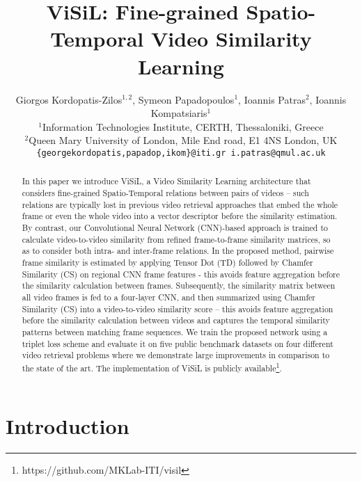 \documentclass[10pt,twocolumn,letterpaper]{article}
\begin{document}
\title{ViSiL: Fine-grained Spatio-Temporal Video Similarity Learning} 

\author{Giorgos Kordopatis-Zilos$^{1,2}$, Symeon Papadopoulos$^1$, Ioannis Patras$^2$, Ioannis Kompatsiaris$^1$\\
$^1$Information Technologies Institute, CERTH, Thessaloniki, Greece \\
$^2$Queen Mary University of London, Mile End road, E1 4NS London, UK \\
{\tt\small \{georgekordopatis,papadop,ikom\}@iti.gr \hspace*{1em} i.patras@qmul.ac.uk}}

\maketitle



\begin{abstract}
In this paper we introduce ViSiL, a Video Similarity Learning architecture that considers fine-grained Spatio-Temporal relations between pairs of videos -- such relations are typically lost in previous video retrieval approaches that embed the whole frame or even the whole video into a vector descriptor before the similarity estimation. By contrast, our Convolutional Neural Network (CNN)-based approach is trained to calculate video-to-video similarity from refined frame-to-frame similarity matrices, so as to consider both intra- and inter-frame relations. In the proposed method, pairwise frame similarity is estimated by applying Tensor Dot (TD) followed by Chamfer Similarity (CS) on regional CNN frame features - this avoids feature aggregation before the similarity calculation between frames. Subsequently, the similarity matrix between all video frames is fed to a four-layer CNN, and then summarized using Chamfer Similarity (CS) into a video-to-video similarity score -- this avoids feature aggregation before the similarity calculation between videos and captures the temporal similarity patterns between matching frame sequences. We train the proposed network using a triplet loss scheme and evaluate it on five public benchmark datasets on four different video retrieval problems where we demonstrate large improvements in comparison to the state of the art. The implementation of ViSiL is publicly available\footnote{https://github.com/MKLab-ITI/visil}.
\end{abstract}

\section{Introduction}
\end{document}
